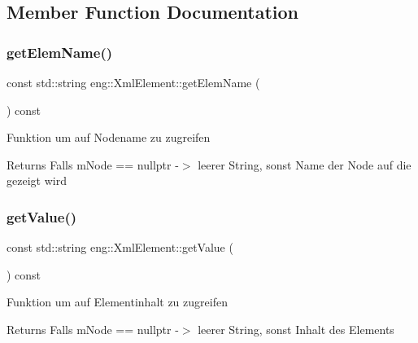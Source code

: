 \subsection{Member Function Documentation}
\mbox{\label{classeng_1_1_xml_element_a65d1de88005f7f59e4ca20f1595d1afb}} 
\subsubsection{\texorpdfstring{get\+Elem\+Name()}{getElemName()}}
{\footnotesize\ttfamily const std\+::string eng\+::\+Xml\+Element\+::get\+Elem\+Name (\begin{DoxyParamCaption}{ }\end{DoxyParamCaption}) const\hspace{0.3cm}{\ttfamily [inline]}}

Funktion um auf Nodename zu zugreifen \begin{DoxyReturn}{Returns}
Falls m\+Node == nullptr -\/$>$ leerer String, sonst Name der Node auf die gezeigt wird 
\end{DoxyReturn}
\mbox{\label{classeng_1_1_xml_element_a280c2de45c58aef6daf1babd240423b7}} 
\subsubsection{\texorpdfstring{get\+Value()}{getValue()}}
{\footnotesize\ttfamily const std\+::string eng\+::\+Xml\+Element\+::get\+Value (\begin{DoxyParamCaption}{ }\end{DoxyParamCaption}) const\hspace{0.3cm}{\ttfamily [inline]}}

Funktion um auf Elementinhalt zu zugreifen \begin{DoxyReturn}{Returns}
Falls m\+Node == nullptr -\/$>$ leerer String, sonst Inhalt des Elements 
\end{DoxyReturn}
\mbox{\label{classeng_1_1_xml_element_aa6f71f5cae1976653f4067e309b7b3c9}} 
